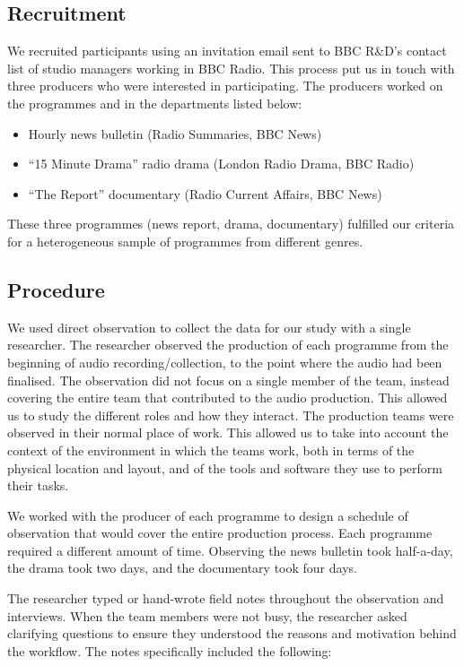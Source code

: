 \subsection{Recruitment}
We recruited participants using an invitation email sent to BBC R\&D's contact list of studio managers working in BBC Radio. This process put us in touch with three producers who were interested in participating. The producers worked on the programmes and in the departments listed below:
\begin{itemize}
	\item Hourly news bulletin (Radio Summaries, BBC News)
	\item ``15 Minute Drama'' radio drama (London Radio Drama, BBC Radio)
	\item ``The Report'' documentary (Radio Current Affairs, BBC News)
\end{itemize}

These three programmes (news report, drama, documentary) fulfilled our criteria for a heterogeneous sample of programmes from different genres.

\subsection{Procedure}
We used direct observation to collect the data for our study with a single researcher. The researcher observed the production of each programme from the beginning of audio recording/collection, to the point where the audio had been finalised. The observation did not focus on a single member of the team, instead covering the entire team that contributed to the audio production. This allowed us to study the different roles and how they interact.
The production teams were observed in their normal place of work. This allowed us to take into account the context of the environment in which the teams work, both in terms of the physical location and layout, and of the tools and software they use to perform their tasks.

We worked with the producer of each programme to design a schedule of observation that would cover the entire production process. Each programme required a different amount of time. Observing the news bulletin took half-a-day, the drama took two days, and the documentary took four days. 

The researcher typed or hand-wrote field notes throughout the observation and interviews. When the team members were not busy, the researcher asked clarifying questions to ensure they understood the reasons and motivation behind the workflow. The notes specifically included the following:

